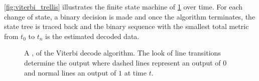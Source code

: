 \cref{fig:viterbi_trellis} illustrates the finite state machine of
\cref{fig:viterbi_fsm} over time. For each change of state, a binary
decision is made and once the algorithm terminates, the state tree is
traced back and the binary sequence with the smallest total metric
from $t_0$ to $t_n$ is the estimated decoded data.

\begin{figure}[H]
  \centering
  \caption{A , of the Viterbi decode algorithm. The look of
    line transitions determine the output where dashed lines represent
    an output of $0$ and normal lines an output of $1$ at time $t$.}
  \label{fig:viterbi_fsm}
\end{figure}

